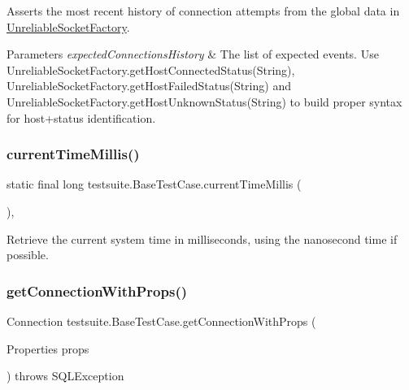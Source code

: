 Asserts the most recent history of connection attempts from the global data in \mbox{\hyperlink{classtestsuite_1_1_unreliable_socket_factory}{Unreliable\+Socket\+Factory}}.


\begin{DoxyParams}{Parameters}
{\em expected\+Connections\+History} & The list of expected events. Use Unreliable\+Socket\+Factory.\+get\+Host\+Connected\+Status(\+String), Unreliable\+Socket\+Factory.\+get\+Host\+Failed\+Status(\+String) and Unreliable\+Socket\+Factory.\+get\+Host\+Unknown\+Status(\+String) to build proper syntax for host+status identification. \\
\hline
\end{DoxyParams}
\mbox{\label{classtestsuite_1_1_base_test_case_a48d748cca7b09172b6e5e2fac15c6bc7}} 
\subsubsection{\texorpdfstring{current\+Time\+Millis()}{currentTimeMillis()}}
{\footnotesize\ttfamily static final long testsuite.\+Base\+Test\+Case.\+current\+Time\+Millis (\begin{DoxyParamCaption}{ }\end{DoxyParamCaption})\hspace{0.3cm}{\ttfamily [static]}, {\ttfamily [protected]}}

Retrieve the current system time in milliseconds, using the nanosecond time if possible. \mbox{\label{classtestsuite_1_1_base_test_case_a694c26abcb73b73849f9d10ffdc4ebae}} 
\subsubsection{\texorpdfstring{get\+Connection\+With\+Props()}{getConnectionWithProps()}}
{\footnotesize\ttfamily Connection testsuite.\+Base\+Test\+Case.\+get\+Connection\+With\+Props (\begin{DoxyParamCaption}\item[{Properties}]{props }\end{DoxyParamCaption}) throws S\+Q\+L\+Exception}

